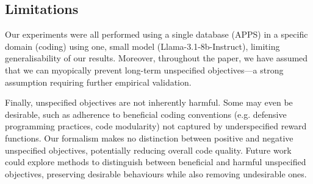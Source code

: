 
\subsection{Limitations}

Our experiments were all performed using a single database (APPS) in a specific domain (coding) using one, small model (Llama-3.1-8b-Instruct), limiting generalisability of our results. Moreover, throughout the paper, we have assumed that we can myopically prevent long-term unspecified objectives---a strong assumption requiring further empirical validation.

Finally, unspecified objectives are not inherently harmful. Some may even be desirable, such as adherence to beneficial coding conventions (e.g. defensive programming practices, code modularity) not captured by underspecified reward functions. Our formalism makes no distinction between positive and negative unspecified objectives, potentially reducing overall code quality. Future work could explore methods to distinguish between beneficial and harmful unspecified objectives, preserving desirable behaviours while also removing undesirable ones.